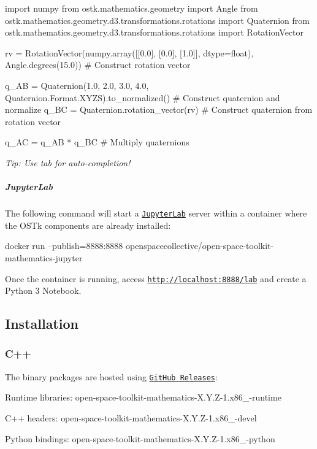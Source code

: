\begin{DoxyCode}
\textcolor{keyword}{import} numpy
\textcolor{keyword}{from} ostk.mathematics.geometry \textcolor{keyword}{import} Angle
\textcolor{keyword}{from} ostk.mathematics.geometry.d3.transformations.rotations \textcolor{keyword}{import} Quaternion
\textcolor{keyword}{from} ostk.mathematics.geometry.d3.transformations.rotations \textcolor{keyword}{import} RotationVector

rv = RotationVector(numpy.array([[0.0], [0.0], [1.0]], dtype=float), Angle.degrees(15.0)) \textcolor{comment}{# Construct
       rotation vector}

q\_AB = Quaternion(1.0, 2.0, 3.0, 4.0, Quaternion.Format.XYZS).to\_normalized() \textcolor{comment}{# Construct quaternion and
       normalize}
q\_BC = Quaternion.rotation\_vector(rv) \textcolor{comment}{# Construct quaternion from rotation vector}

q\_AC = q\_AB * q\_BC \textcolor{comment}{# Multiply quaternions}
\end{DoxyCode}


{\itshape Tip\+: Use tab for auto-\/completion!}

\subparagraph*{Jupyter\+Lab}

The following command will start a \href{https://jupyterlab.readthedocs.io/en/stable/}{\tt Jupyter\+Lab} server within a container where the O\+S\+Tk components are already installed\+:


\begin{DoxyCode}
docker run --publish=8888:8888 openspacecollective/open-space-toolkit-mathematics-jupyter
\end{DoxyCode}


Once the container is running, access \href{http://localhost:8888/lab}{\tt http\+://localhost\+:8888/lab} and create a Python 3 Notebook.

\subsection*{Installation}

\subsubsection*{C++}

The binary packages are hosted using \href{https://github.com/open-space-collective/open-space-toolkit-mathematics/releases}{\tt Git\+Hub Releases}\+:


\begin{DoxyItemize}
\item Runtime libraries\+: {\ttfamily open-\/space-\/toolkit-\/mathematics-\/\+X.\+Y.\+Z-\/1.\+x86\+\_-\/runtime}
\item C++ headers\+: {\ttfamily open-\/space-\/toolkit-\/mathematics-\/\+X.\+Y.\+Z-\/1.\+x86\+\_-\/devel}
\item Python bindings\+: {\ttfamily open-\/space-\/toolkit-\/mathematics-\/\+X.\+Y.\+Z-\/1.\+x86\+\_-\/python}
\end{DoxyItemize}

